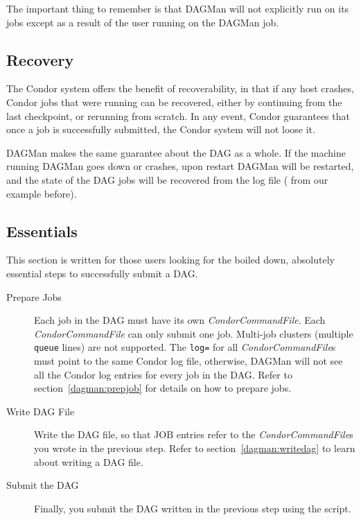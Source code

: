 The important thing to remember is that DAGMan will not explicitly run
 on its jobs except as a result of the user running  on
the DAGMan job.

\subsection{Recovery}

The Condor system offers the benefit of recoverability, in that if any host
crashes, Condor jobs that were running can be recovered, either by continuing
from the last checkpoint, or rerunning from scratch.  In any event, Condor
guarantees that once a job is successfully submitted, the Condor system will
not loose it.

DAGMan makes the same guarantee about the DAG as a whole.  If the machine
running DAGMan goes down or crashes, upon restart DAGMan will be restarted,
and the state of the DAG jobs will be recovered from the log file
( from our example before).

\subsection{Essentials}
\label{dagman:essentials}

This section is written for those users looking for the boiled down,
absolutely essential steps to successfully submit a DAG.

\begin{description}

\item[Prepare Jobs] Each job in the DAG must have its own
\textit{CondorCommandFile}.  Each \textit{CondorCommandFile} can only submit
one job.  Multi-job clusters (multiple \texttt{queue} lines) are not
supported.  The \texttt{log=} for all \textit{CondorCommandFile}s must point
to the same Condor log file, otherwise, DAGMan will not see all the Condor log
entries for every job in the DAG.  Refer to section~\ref{dagman:prepjob} for
details on how to prepare jobs.

\item[Write DAG File] Write the DAG file, so that JOB entries refer to the
\textit{CondorCommandFile}s you wrote in the previous step.  Refer to
section~\ref{dagman:writedag} to learn about writing a DAG file.

\item[Submit the DAG] Finally, you submit the DAG written in the previous step
using the  script.

\end{description}


